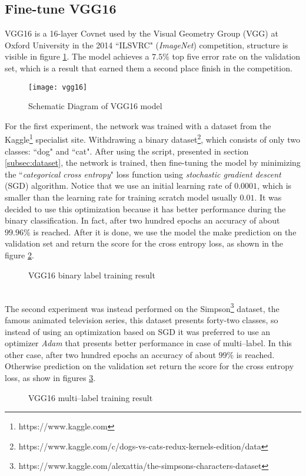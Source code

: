 \subsection{Fine-tune VGG16} 
\label{subsec:vgg16}
VGG16 is a 16-layer Covnet used by the Visual Geometry Group (VGG) at Oxford 
University in the 2014 ``ILSVRC" (\emph{ImageNet}) competition,
structure is visible in figure \ref{fig:vgg16schema}. 
The model achieves a $7.5\%$ top five error rate on the validation set, which 
is a result that earned them a second place finish in the competition.
%
\begin{figure}[htb]
\centering
\texttt{[image: vgg16]}
\caption{Schematic Diagram of VGG16 model}
\label{fig:vgg16schema}
\end{figure}
%
For the first experiment, the network was trained with a dataset from 
the Kaggle\footnote{https://www.kaggle.com} specialist site. 
Withdrawing a binary 
dataset\footnote{https://www.kaggle.com/c/dogs-vs-cats-redux-kernels-edition/data}, 
which consists of only two classes: ``dog" and ``cat".
After using the script, presented in section \ref {subsec:dataset}, the network
is trained, then fine-tuning the model by minimizing the ``\emph{categorical 
cross entropy}" loss function using \emph {stochastic gradient descent} (SGD) 
algorithm.
Notice that we use an initial learning
rate of $0.0001$, which is smaller than the learning rate for training scratch
model usually $0.01$.
It was decided to use this optimization because it has better performance 
during the binary classification.
In fact, after two hundred epochs an accuracy of about $99.96\%$ is reached. 
After it is done, we use the model the make prediction on the validation set 
and return the score for the cross entropy loss, as shown in the 
figure \ref{fig:vgg16resultbin}. \linebreak
\begin{figure}[htb]
\centering
{} \quad
{} 
\caption{VGG16 binary label training result}
\label{fig:vgg16resultbin}
\end{figure}
%
\\The second experiment was instead performed on the 
Simpson\footnote{https://www.kaggle.com/alexattia/the-simpsons-characters-dataset} 
dataset, the famous animated television series, this dataset presents forty-two 
classes, so instead of using an optimization based on SGD it was preferred to 
use an optimizer \emph{Adam} that presents better performance in case of 
multi--label.
In this other case, after two hundred epochs an accuracy of about $99\%$ is 
reached.
Otherwise prediction on the validation set return the score for the cross 
entropy loss, as show in figures \ref{fig:vgg16resultmulti}.
%
\begin{figure}[htb]
\centering
{} \quad
{} 
\caption{VGG16 multi--label training result}
\label{fig:vgg16resultmulti}
\end{figure}
%
